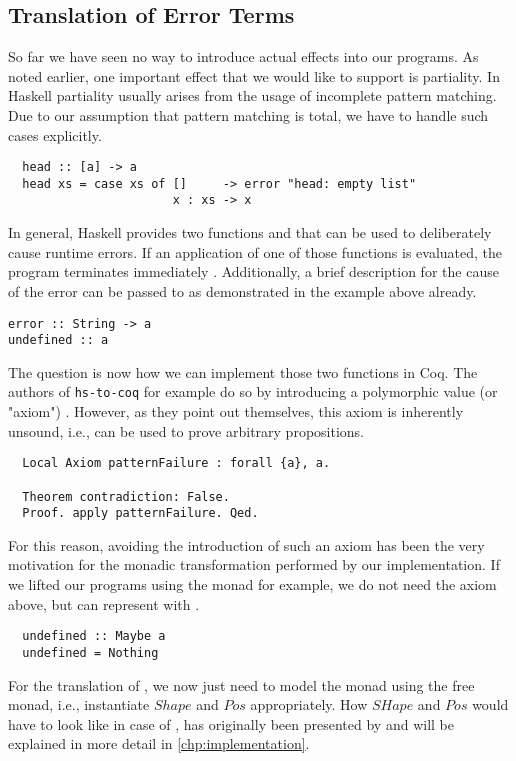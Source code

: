 \subsection{Translation of Error Terms} \label{sec:translation:expr:errors}
So far we have seen no way to introduce actual effects into our programs.
As noted earlier, one important effect that we would like to support is partiality.
In Haskell partiality usually arises from the usage of incomplete pattern matching.
Due to our assumption that pattern matching is total, we have to handle such cases explicitly.
\begin{verbatim}
  head :: [a] -> a
  head xs = case xs of []     -> error "head: empty list"
                       x : xs -> x
\end{verbatim}
In general, Haskell provides two functions  and  that can be used to deliberately cause runtime errors.
If an application of one of those functions is evaluated, the program terminates immediately \cite[p.~16]{Marlow:2010}.
Additionally, a brief description for the cause of the error can be passed to  as demonstrated in the example above already.
\begin{verbatim}
error :: String -> a
undefined :: a
\end{verbatim}

The question is now how we can implement those two functions in Coq.
The authors of \texttt{hs-to-coq} for example do so by introducing a polymorphic value (or "axiom")  \cite[p.~10]{SpectorZabusky:2017}.
However, as they point out themselves, this axiom is inherently unsound, i.e., can be used to prove arbitrary propositions.
\begin{verbatim}
  Local Axiom patternFailure : forall {a}, a.

  Theorem contradiction: False.
  Proof. apply patternFailure. Qed.
\end{verbatim}

For this reason, avoiding the introduction of such an axiom has been the very motivation for the monadic transformation performed by our implementation.
If we lifted our programs using the  monad for example, we do not need the axiom above, but can represent  with .
\begin{verbatim}
  undefined :: Maybe a
  undefined = Nothing
\end{verbatim}
For the translation of , we now just need to model the  monad using the free monad, i.e., instantiate $Shape$ and $Pos$ appropriately.
How $SHape$ and $Pos$ would have to look like in case of , has originally been presented by \cite{Dylus:2018} and will be explained in more detail in \autoref{chp:implementation}. %

